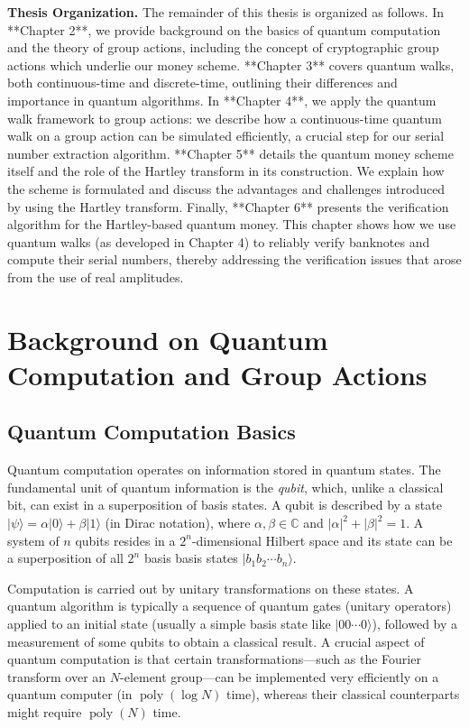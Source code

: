 \documentclass[11pt]{article}
\theoremstyle{definition}
\begin{document}
\medskip\noindent\textbf{Thesis Organization.} 
The remainder of this thesis is organized as follows. In **Chapter 2**, we provide background on the basics of quantum computation and the theory of group actions, including the concept of cryptographic group actions which underlie our money scheme. **Chapter 3** covers quantum walks, both continuous-time and discrete-time, outlining their differences and importance in quantum algorithms. In **Chapter 4**, we apply the quantum walk framework to group actions: we describe how a continuous-time quantum walk on a group action can be simulated efficiently, a crucial step for our serial number extraction algorithm. **Chapter 5** details the quantum money scheme itself and the role of the Hartley transform in its construction. We explain how the scheme is formulated and discuss the advantages and challenges introduced by using the Hartley transform. Finally, **Chapter 6** presents the verification algorithm for the Hartley-based quantum money. This chapter shows how we use quantum walks (as developed in Chapter 4) to reliably verify banknotes and compute their serial numbers, thereby addressing the verification issues that arose from the use of real amplitudes.
\vspace{1em}






\chapter{Background on Quantum Computation and Group Actions}

\section{Quantum Computation Basics}
Quantum computation operates on information stored in quantum states. The fundamental unit of quantum information is the \emph{qubit}, which, unlike a classical bit, can exist in a superposition of basis states. A qubit is described by a state $|\psi\rangle = \alpha |0\rangle + \beta |1\rangle$ (in Dirac notation), where $\alpha,\beta \in \mathbb{C}$ and $|\alpha|^2 + |\beta|^2 = 1$. A system of $n$ qubits resides in a $2^n$-dimensional Hilbert space and its state can be a superposition of all $2^n$ basis basis states $|b_1b_2\cdots b_n\rangle$. 

Computation is carried out by unitary transformations on these states. A quantum algorithm is typically a sequence of quantum gates (unitary operators) applied to an initial state (usually a simple basis state like $|00\cdots0\rangle$), followed by a measurement of some qubits to obtain a classical result. A crucial aspect of quantum computation is that certain transformations—such as the Fourier transform over an $N$-element group—can be implemented very efficiently on a quantum computer (in $\operatorname{poly}(\log N)$ time), whereas their classical counterparts might require $\operatorname{poly}(N)$ time.
\end{document}
